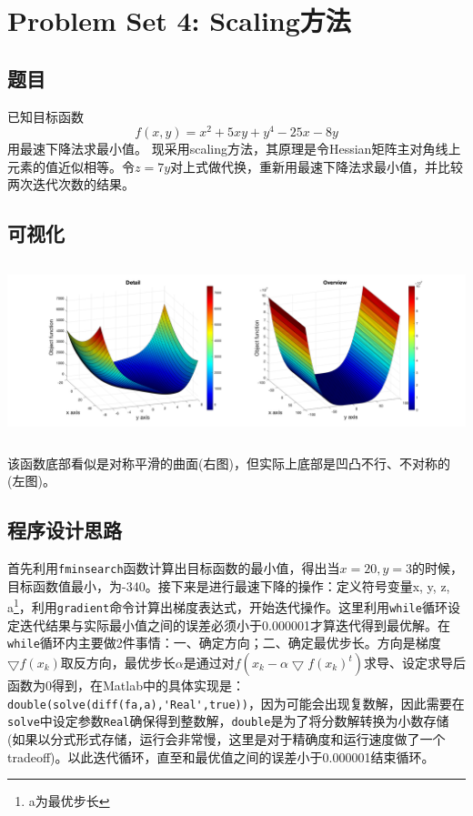 \documentclass[a4paper, 12pt]{ctexart}  %
\begin{document}
\section{Problem Set 4: Scaling方法}
\subsection{题目}
已知目标函数
\begin{equation}
f(x,y)=x^2+5xy+y^4-25x-8y
\end{equation}
用最速下降法求最小值。
现采用scaling方法，其原理是令Hessian矩阵主对角线上元素的值近似相等。令$z=7y$对上式做代换，重新用最速下降法求最小值，并比较两次迭代次数的结果。
\subsection{可视化}
\includegraphics[height=2in, width=6in]{visualization.png}

该函数底部看似是对称平滑的曲面(右图)，但实际上底部是凹凸不行、不对称的(左图)。
\subsection{程序设计思路}
首先利用\verb|fminsearch|函数计算出目标函数的最小值，得出当$x=20, y = 3$的时候，目标函数值最小，为-340。接下来是进行最速下降的操作：定义符号变量x, y, z, a\footnote{a为最优步长}，利用\verb|gradient|命令计算出梯度表达式，开始迭代操作。这里利用\verb|while|循环设定迭代结果与实际最小值之间的误差必须小于0.000001才算迭代得到最优解。在\verb|while|循环内主要做2件事情：一、确定方向；二、确定最优步长。方向是梯度$\bigtriangledown f(x_{k})$取反方向，最优步长$\alpha$是通过对$f(x_{k}-\alpha \bigtriangledown f(x_{k})^t)$求导、设定求导后函数为0得到，在Matlab中的具体实现是：\verb|double(solve(diff(fa,a),'Real',true))|，因为可能会出现复数解，因此需要在\verb|solve|中设定参数\verb|Real|确保得到整数解，\verb|double|是为了将分数解转换为小数存储(如果以分式形式存储，运行会非常慢，这里是对于精确度和运行速度做了一个tradeoff)。以此迭代循环，直至和最优值之间的误差小于0.000001结束循环。
\end{document}
